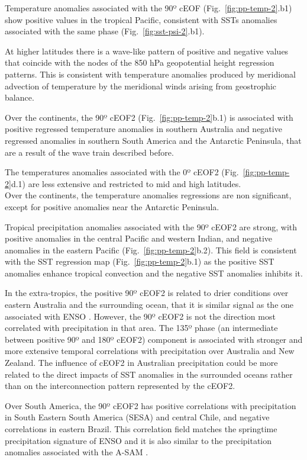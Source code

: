 \documentclass[pdflatex,sn-basic]{sn-jnl}
\theoremstyle{thmstyleone}%
\theoremstyle{thmstyletwo}%
\theoremstyle{thmstylethree}%
\begin{document}
Temperature anomalies associated with the 90º cEOF (Fig.~\ref{fig:pp-temp-2}.b1) show positive values in the tropical Pacific, consistent with SSTs anomalies associated with the same phase (Fig.~\ref{fig:sst-psi-2}.b1).

At higher latitudes there is a wave-like pattern of positive and negative values that coincide with the nodes of the 850 hPa geopotential height regression patterns.
This is consistent with temperature anomalies produced by meridional advection of temperature by the meridional winds arising from geostrophic balance.

Over the continents, the 90º cEOF2 (Fig.~\ref{fig:pp-temp-2}b.1) is associated with positive regressed temperature anomalies in southern Australia and negative regressed anomalies in southern South America and the Antarctic Peninsula, that are a result of the wave train described before.

The temperatures anomalies associated with the 0º cEOF2 (Fig.~\ref{fig:pp-temp-2}d.1) are less extensive and restricted to mid and high latitudes.\\
Over the continents, the temperature anomalies regressions are non significant, except for positive anomalies near the Antarctic Peninsula.

Tropical precipitation anomalies associated with the 90º cEOF2 are strong, with positive anomalies in the central Pacific and western Indian, and negative anomalies in the eastern Pacific (Fig.~\ref{fig:pp-temp-2}b.2).
This field is consistent with the SST regression map (Fig.~\ref{fig:pp-temp-2}b.1) as the positive SST anomalies enhance tropical convection and the negative SST anomalies inhibits it.

In the extra-tropics, the positive 90º cEOF2 is related to drier conditions over eastern Australia and the surrounding ocean, that it is similar signal as the one associated with ENSO \citep{cai2011}.
However, the 90º cEOF2 is not the direction most correlated with precipitation in that area.
The 135º phase (an intermediate between positive 90º and 180º cEOF2) component is associated with stronger and more extensive temporal correlations with precipitation over Australia and New Zealand.
The influence of cEOF2 in Australian precipitation could be more related to the direct impacts of SST anomalies in the surrounded oceans rather than on the interconnection pattern represented by the cEOF2.

Over South America, the 90º cEOF2 has positive correlations with precipitation in South Eastern South America (SESA) and central Chile, and negative correlations in eastern Brazil. This correlation field matches the springtime precipitation signature of ENSO \citep[e.g.][]{cai2020a} and it is also similar to the precipitation anomalies associated with the A-SAM \citep{campitelli2022}.
\end{document}
